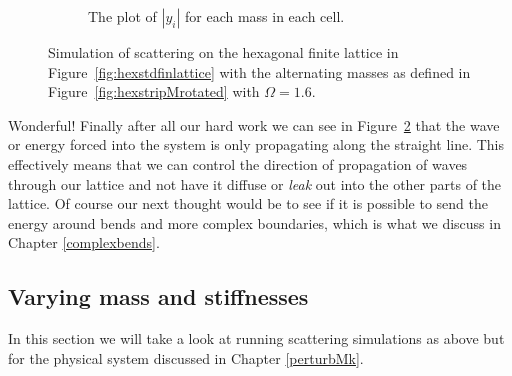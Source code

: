 \begin{figure}
\begin{subfigure}[b]{.5\textwidth}
  \caption{The plot of $|y_i|$ for each mass in each cell.}
  \label{fig:sub2}
\end{subfigure}
\caption{Simulation of scattering on the hexagonal finite lattice in
  Figure~\ref{fig:hexstdfinlattice} with the alternating masses as defined in
  Figure~\ref{fig:hexstripMrotated} with $\Omega = 1.6$.}
\label{fig:hexstdrotstraight}
\end{figure}

Wonderful! Finally after all our hard work we can see in
Figure~\ref{fig:hexstdrotstraight} that the wave or energy forced into the
system is only propagating along the straight line. This effectively means that
we can control the direction of propagation of waves through our lattice and
not have it diffuse or \textit{leak} out into the other parts of the lattice.
Of course our next thought would be to see if it is possible to send the energy
around bends and more complex boundaries, which is what we discuss in Chapter
\ref{complexbends}.

\subsection{Varying mass and stiffnesses}
In this section we will take a look at running scattering simulations as above
but for the physical system discussed in Chapter \ref{perturbMk}.

